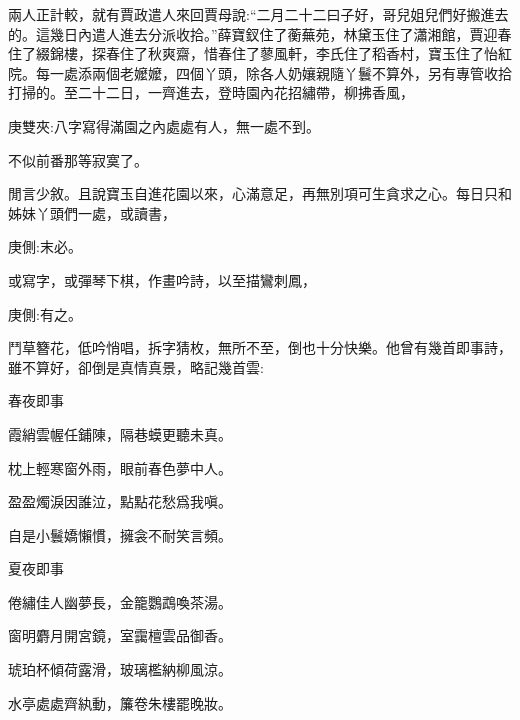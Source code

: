 \begin{parag}
    兩人正計較，就有賈政遣人來回賈母說:“二月二十二曰子好，哥兒姐兒們好搬進去的。這幾日內遣人進去分派收拾。”薛寶釵住了蘅蕪苑，林黛玉住了瀟湘館，賈迎春住了綴錦樓，探春住了秋爽齋，惜春住了蓼風軒，李氏住了稻香村，寶玉住了怡紅院。每一處添兩個老嬤嬤，四個丫頭，除各人奶孃親隨丫鬟不算外，另有專管收拾打掃的。至二十二日，一齊進去，登時園內花招繡帶，柳拂香風，\begin{note}庚雙夾:八字寫得滿園之內處處有人，無一處不到。\end{note}不似前番那等寂寞了。
\end{parag}


\begin{parag}
    閒言少敘。且說寶玉自進花園以來，心滿意足，再無別項可生貪求之心。每日只和姊妹丫頭們一處，或讀書，\begin{note}庚側:末必。\end{note}或寫字，或彈琴下棋，作畫吟詩，以至描鸞刺鳳，\begin{note}庚側:有之。\end{note}鬥草簪花，低吟悄唱，拆字猜枚，無所不至，倒也十分快樂。他曾有幾首即事詩，雖不算好，卻倒是真情真景，略記幾首雲:
\end{parag}


\begin{poem}
    \begin{pl}春夜即事\end{pl}

    \begin{pl}霞綃雲幄任鋪陳，隔巷蟆更聽未真。\end{pl}

    \begin{pl}枕上輕寒窗外雨，眼前春色夢中人。\end{pl}

    \begin{pl}盈盈燭淚因誰泣，點點花愁爲我嗔。\end{pl}

    \begin{pl}自是小鬟嬌懶慣，擁衾不耐笑言頻。\end{pl}
\end{poem}


\begin{poem}
    \begin{pl}夏夜即事\end{pl}

    \begin{pl}倦繡佳人幽夢長，金籠鸚鵡喚茶湯。\end{pl}

    \begin{pl}窗明麝月開宮鏡，室靄檀雲品御香。\end{pl}

    \begin{pl}琥珀杯傾荷露滑，玻璃檻納柳風涼。\end{pl}

    \begin{pl}水亭處處齊紈動，簾卷朱樓罷晚妝。\end{pl}

\end{poem}


